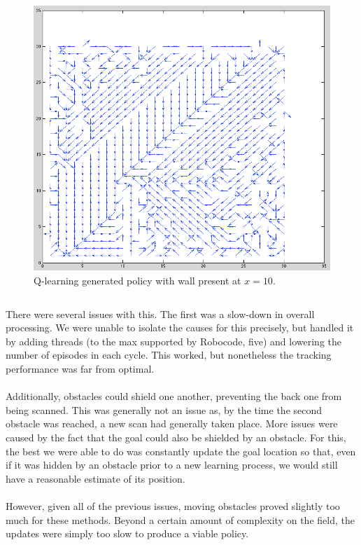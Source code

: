 \documentclass{aiaa-tc}%
\begin{document}
\begin{figure}[htbp]
  \centering
  \includegraphics[width=\linewidth]{images/Wall2.png} 
  \caption{Q-learning generated policy with wall present at $x=10$.}
  \label{fig:obstacleQ}
\end{figure}
\clearpage
\begin{verbatim}
\end{verbatim}
There were several issues with this. The first was a slow-down in overall processing. We were unable to isolate the causes for this precisely, but handled it by adding threads (to the max supported by Robocode, five) and lowering the number of episodes in each cycle. This worked, but nonetheless the tracking performance was far from optimal. \\ \\
Additionally, obstacles could shield one
another, preventing the back one from being scanned. This was
generally not an issue as, by the time the second obstacle was
reached, a new scan had generally taken place. More issues were caused
by the fact that the goal could also be shielded by an
obstacle. For this, the best we were able to do was constantly update
the goal location so that, even if it was hidden by an obstacle prior
to a new learning process, we would still have a reasonable estimate
of its position. \\ \\
However, given all of the previous issues, moving obstacles proved
slightly too much for these methods. Beyond a certain amount of
complexity on the field, the updates were simply too slow to produce a
viable policy.
\end{document}
